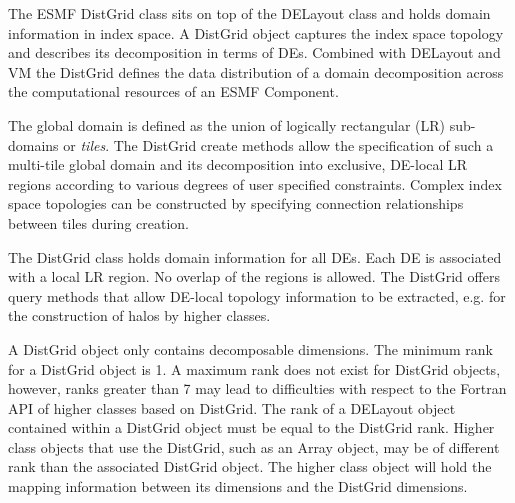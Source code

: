 %

\label{sec:DistGrid}
The ESMF DistGrid class sits on top of the DELayout class and holds domain
information in index space. A DistGrid object captures the index space topology
and describes its decomposition in terms of DEs. Combined with DELayout and VM
the DistGrid defines the data distribution of a domain decomposition across the
computational resources of an ESMF Component.

The global domain is defined as the union of logically
rectangular (LR) sub-domains or {\em tiles}. The DistGrid create methods allow
the specification of such a multi-tile global domain and its decomposition into
exclusive, DE-local LR regions according to various degrees of user specified
constraints. Complex index space topologies can be constructed by specifying
connection relationships between tiles during creation.

The DistGrid class holds domain information for all DEs. Each DE is associated
with a local LR region. No overlap of the regions is allowed. The DistGrid
offers query methods that allow DE-local topology information to be extracted,
e.g. for the construction of halos by higher classes.

A DistGrid object only contains decomposable dimensions. The minimum rank for a
DistGrid object is 1. A maximum rank does not exist for DistGrid objects, 
however, ranks greater than 7 may lead to difficulties with respect to the
Fortran API of higher classes based on DistGrid. The rank of a DELayout object
contained within a DistGrid object must be equal to the DistGrid rank. Higher
class objects that use the DistGrid, such as an Array object, may be of
different rank than the associated DistGrid object. The higher class object
will hold the mapping information between its dimensions and the DistGrid
dimensions.
